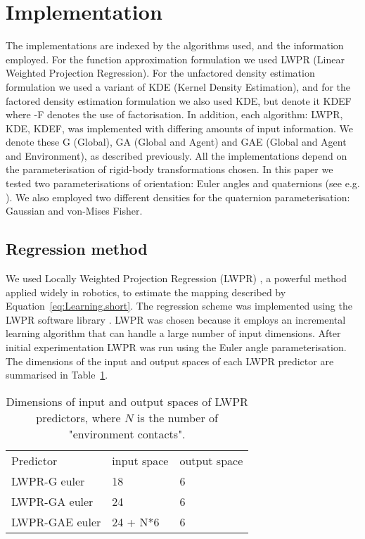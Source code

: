 \section{Implementation}\label{sec:Implementation}

\newcommand{\bx}{\mathbf{x}}
\newcommand{\by}{\mathbf{y}}

The implementations are indexed by the algorithms used, and the information employed. For the function approximation formulation we used LWPR (Linear Weighted Projection Regression). For the unfactored density estimation formulation we used a variant of KDE (Kernel Density Estimation), and for the factored density estimation formulation we also used KDE, but denote it KDEF where -F denotes the use of factorisation. In addition, each algorithm: LWPR, KDE, KDEF, was implemented with differing amounts of input information. We denote these G (Global), GA (Global and Agent) and GAE (Global and Agent and Environment), as described previously. All the implementations depend on the parameterisation of rigid-body transformations chosen. In this paper we tested two parameterisations of orientation: Euler angles and quaternions (see e.g. \cite{murray_mathematical_1994}). We also employed two different densities for the quaternion parameterisation: Gaussian and von-Mises Fisher.

\subsection{Regression method}\label{sec:Implementation.regression}

We used Locally Weighted Projection Regression (LWPR) \cite{vijayakumar_incremental_2005}, a powerful method applied widely in robotics, to estimate the mapping described by Equation~\eqref{eq:Learning.short}. The regression scheme was implemented using the LWPR software library \cite{klanke_library_2008}. LWPR was chosen because it employs an incremental learning algorithm that can handle a large number of input dimensions. After initial experimentation LWPR was run using the Euler angle parameterisation. The dimensions of the input and output spaces of each LWPR predictor are summarised in Table~\ref{tab:InpOutSpaceLWPR}.

\begin{table}[b]
\begin{center}
\begin{tabular}{|l|l|l|}
\cline{1-3}
Predictor & input space & output space \\
\cline{1-3}
LWPR-G euler & 18 & 6 \\
LWPR-GA euler & 24 & 6 \\
LWPR-GAE euler & 24 + N*6 & 6 \\
\cline{1-3}
\end{tabular}
\end{center}
\caption[Input/output space LWPR]{Dimensions of input and output spaces
of LWPR predictors, where $N$ is the number of
"environment contacts".}\label{tab:InpOutSpaceLWPR}
\end{table}


